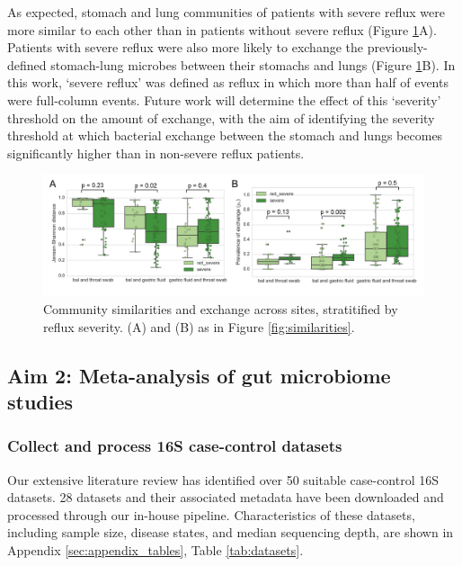 \documentclass[12pt]{article}
\begin{document}
As expected, stomach and lung communities of patients with severe reflux were
more similar to each other than in patients without
severe reflux (Figure \ref{fig:reflux}A). 
Patients with severe reflux were also more likely
to exchange the previously-defined stomach-lung microbes between their stomachs and lungs (Figure \ref{fig:reflux}B).
In this work, `severe reflux' was defined as reflux in 
which more than half of events were full-column events.
Future work will determine the effect of this `severity' 
threshold on the amount of exchange, with the aim
of identifying the severity threshold at which bacterial exchange
between the stomach and lungs becomes significantly higher than in non-severe reflux patients.

\begin{figure}[h]
\begin{center}
	\includegraphics[scale=0.65]{reflux}
	\caption{Community similarities and exchange across sites, stratitified by reflux severity.
	(A) and (B) as in Figure \ref{fig:similarities}.}
	\label{fig:reflux}
\end{center}
\end{figure}


\subsection{Aim 2: Meta-analysis of gut microbiome studies}
\subsubsection{Collect and process 16S case-control datasets}
Our extensive literature review has identified over 50 suitable case-control 16S datasets.
28 datasets and their associated metadata have been downloaded and processed through our in-house pipeline.
Characteristics of these datasets, including sample size, disease states,
and median sequencing depth, are shown in Appendix \ref{sec:appendix_tables}, Table \ref{tab:datasets}.
\end{document}
